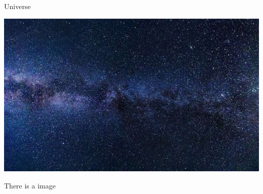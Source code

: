 \documentclass{article}
\begin{document}
Universe

\includegraphics{universe}

There is a image
\end{document}

